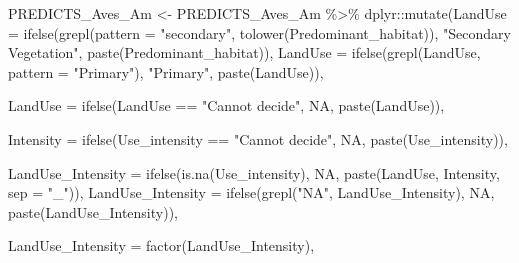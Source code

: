 \documentclass[
]{article}
\newenvironment{Shaded}{\begin{snugshade}}{\end{snugshade}}
\newcommand{\AttributeTok}[1]{\textcolor[rgb]{0.77,0.63,0.00}{#1}}
\newcommand{\ConstantTok}[1]{\textcolor[rgb]{0.00,0.00,0.00}{#1}}
\newcommand{\FunctionTok}[1]{\textcolor[rgb]{0.00,0.00,0.00}{#1}}
\newcommand{\NormalTok}[1]{#1}
\newcommand{\OtherTok}[1]{\textcolor[rgb]{0.56,0.35,0.01}{#1}}
\newcommand{\SpecialCharTok}[1]{\textcolor[rgb]{0.00,0.00,0.00}{#1}}
\newcommand{\StringTok}[1]{\textcolor[rgb]{0.31,0.60,0.02}{#1}}
\begin{document}
\begin{Shaded}
\begin{Highlighting}[]
\NormalTok{PREDICTS\_Aves\_Am }\OtherTok{\textless{}{-}}\NormalTok{ PREDICTS\_Aves\_Am }\SpecialCharTok{\%\textgreater{}\%}\NormalTok{ dplyr}\SpecialCharTok{::}\FunctionTok{mutate}\NormalTok{(}\AttributeTok{LandUse =} \FunctionTok{ifelse}\NormalTok{(}\FunctionTok{grepl}\NormalTok{(}\AttributeTok{pattern =} \StringTok{"secondary"}\NormalTok{, }\FunctionTok{tolower}\NormalTok{(Predominant\_habitat)), }\StringTok{"Secondary Vegetation"}\NormalTok{, }\FunctionTok{paste}\NormalTok{(Predominant\_habitat)),}
                                                       \AttributeTok{LandUse =} \FunctionTok{ifelse}\NormalTok{(}\FunctionTok{grepl}\NormalTok{(LandUse, }\AttributeTok{pattern =} \StringTok{"Primary"}\NormalTok{), }\StringTok{"Primary"}\NormalTok{, }\FunctionTok{paste}\NormalTok{(LandUse)),}
                                                       
                                                       \AttributeTok{LandUse =} \FunctionTok{ifelse}\NormalTok{(LandUse }\SpecialCharTok{==} \StringTok{"Cannot decide"}\NormalTok{, }\ConstantTok{NA}\NormalTok{, }\FunctionTok{paste}\NormalTok{(LandUse)),}
                                                       
                                                       \AttributeTok{Intensity =} \FunctionTok{ifelse}\NormalTok{(Use\_intensity }\SpecialCharTok{==} \StringTok{"Cannot decide"}\NormalTok{, }\ConstantTok{NA}\NormalTok{, }\FunctionTok{paste}\NormalTok{(Use\_intensity)),}
                                                       
                                                       \AttributeTok{LandUse\_Intensity =} \FunctionTok{ifelse}\NormalTok{(}\FunctionTok{is.na}\NormalTok{(Use\_intensity), }\ConstantTok{NA}\NormalTok{, }\FunctionTok{paste}\NormalTok{(LandUse, Intensity, }\AttributeTok{sep =} \StringTok{"\_"}\NormalTok{)),}
                                                       \AttributeTok{LandUse\_Intensity =} \FunctionTok{ifelse}\NormalTok{(}\FunctionTok{grepl}\NormalTok{(}\StringTok{"NA"}\NormalTok{, LandUse\_Intensity), }\ConstantTok{NA}\NormalTok{, }\FunctionTok{paste}\NormalTok{(LandUse\_Intensity)),}
                                                       
                                                       \AttributeTok{LandUse\_Intensity =} \FunctionTok{factor}\NormalTok{(LandUse\_Intensity),}
                                                       

\end{Highlighting}
\end{Shaded}
\end{document}
